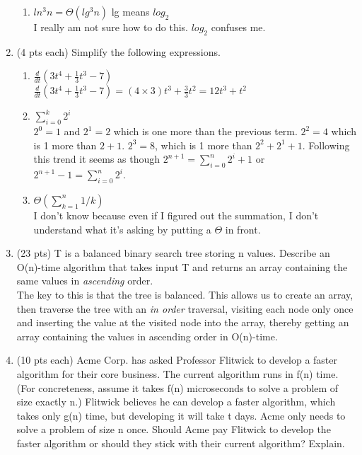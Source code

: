 \documentclass[11pt]{article}
\theoremstyle{definition}
\numberwithin{equation}{section}
\begin{document}
\begin{enumerate}
\begin{enumerate}
		\item $ln^3n = \Theta(lg^3n)$ lg means $log_2$ \\
		I really am not sure how to do this. $log_2$ confuses me.
		
	\end{enumerate}
	
	\item (4 pts each) Simplify the following expressions.
	\begin{enumerate}
	
		\item $\frac{d}{dt}(3t^4 + \frac{1}{3}t^3 - 7)$ \\
		$\frac{d}{dt}(3t^4 + \frac{1}{3}t^3 - 7) = (4 \times 3)t^3 + \frac{3}{3}t^2 = 12t^3 + t^2 $\\
		
		
		\item $\sum\limits_{i=0}^k 2^i$ \\
		$2^0 = 1$ and $2^1 = 2$ which is one more than the previous term. $2^2 = 4$ which is 1 more than $2+1$. $2^3 = 8$, which is 1 more than $2^2 + 2^1 + 1$. Following this trend it seems as though $2^{n+1} = \sum\limits_{i=0}^n 2^i +1$ or $2^{n+1} -1 = \sum\limits_{i=0}^n 2^i$.
		
		\item $\Theta \left( \sum\limits_{k=1}^n 1/k\right)$\\
		I don't know because even if I figured out the summation, I don't understand what it's asking by putting a $\Theta$ in front.
	
	\end{enumerate}
	
	\item (23 pts) T is a balanced binary search tree storing n values. Describe an O(n)-time algorithm that takes input T and returns an array containing the same values in \emph{ascending} order. \\
	
	The key to this is that the tree is balanced. This allows us to create an array, then traverse the tree with an \emph{in order} traversal, visiting each node only once and inserting the value at the visited node into the array, thereby getting an array containing the values in ascending order in O(n)-time. 
	
	\item (10 pts each) Acme Corp. has asked Professor Flitwick to develop a faster algorithm for their core business. The current algorithm runs in f(n) time. (For concreteness, assume it takes f(n) microseconds to solve a problem of size exactly n.) Flitwick believes he can develop a faster algorithm, which takes only g(n) time, but developing it will take t days. Acme only needs to solve a problem of size n once. Should Acme pay Flitwick to develop the faster algorithm or should they stick with their current algorithm? Explain.
	

\end{enumerate}
\end{document}
